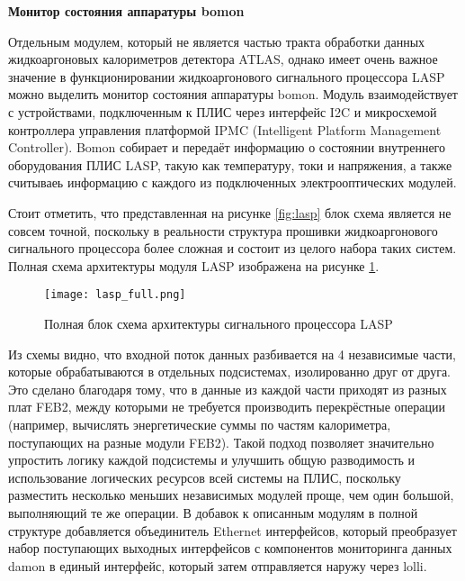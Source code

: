 \textbf{Монитор состояния аппаратуры bomon}\par
Отдельным модулем, который не является частью тракта обработки данных жидкоаргоновых калориметров детектора ATLAS, однако имеет очень важное значение в функционировании жидкоаргонового сигнального процессора LASP можно выделить монитор состояния аппаратуры bomon. Модуль взаимодействует с устройствами, подключенным к ПЛИС через интерфейс I2C и микросхемой контроллера управления платформой IPMC (Intelligent Platform Management Controller). Bomon собирает и передаёт информацию о состоянии внутреннего оборудования ПЛИС LASP, такую как температуру, токи и напряжения, а также считываеь информацию с каждого из подключенных электрооптических модулей.\par
Стоит отметить, что представленная на рисунке \ref{fig:lasp} блок схема является не совсем точной, поскольку в реальности структура прошивки жидкоаргонового сигнального процессора более сложная и состоит из целого набора таких систем. Полная схема архитектуры модуля LASP изображена на рисунке \ref{fig:lasp_full}.\par

\begin{figure}[ht]
    \centering
    \texttt{[image: lasp\_full.png]}
    \caption{Полная блок схема архитектуры сигнального процессора LASP}
    \label{fig:lasp_full}
\end{figure}\par

Из схемы видно, что входной поток данных разбивается на 4 независимые части, которые обрабатываются в отдельных подсистемах, изолированно друг от друга. Это сделано благодаря тому, что в данные из каждой части приходят из разных плат FEB2, между которыми не требуется производить перекрёстные операции (например, вычислять энергетические суммы по частям калориметра, поступающих на разные модули FEB2). Такой подход позволяет значительно упростить логику каждой подсистемы и улучшить общую разводимость и использование логических ресурсов всей системы на ПЛИС, поскольку разместить несколько меньших независимых модулей проще, чем один большой, выполняющий те же операции. В добавок к описанным модулям в полной структуре добавляется объединитель Ethernet интерфейсов, который преобразует набор поступающих выходных интерфейсов с компонентов мониторинга данных damon в единый интерфейс, который затем отправляется наружу через lolli.\par

